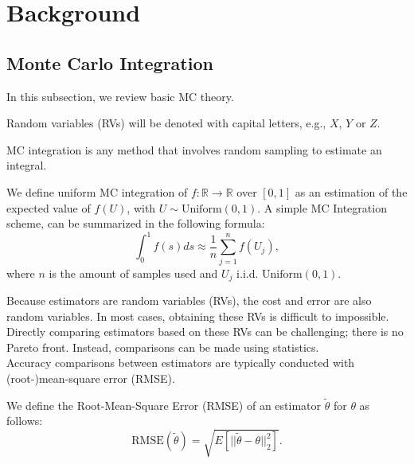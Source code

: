\documentclass[a4paper,12pt]{article}
\begin{document}
\section{Background}

\subsection{Monte Carlo Integration}

In this subsection, we review basic MC theory. \\

\begin{notation}
  Random variables (RVs) will be denoted with capital letters, e.g., $X$, $Y$ or $Z$.
\end{notation}


MC integration is any method that involves random sampling to
estimate an integral.
\begin{definition}
  We define uniform MC integration of
  $f:\mathbb{R} \rightarrow \mathbb{R}$
  over $[0,1]$ as
  an estimation of the expected value of $f(U)$, with
  $U \sim \text{Uniform}(0,1)$. A simple MC Integration
  scheme, can be summarized in the following formula:
  \begin{equation}\label{eq:BLUE}
    \int_{0}^1 f(s)ds \approx \frac{1}{n} \sum_{j=1}^{n}f(U_{j}),
  \end{equation}
  where $n$ is the amount of samples used and $U_{j}$ i.i.d. $\text{Uniform}(0,1)$.
\end{definition}

Because estimators are random variables (RVs), the cost and error are also random
variables. In most cases, obtaining these RVs is difficult to impossible.
Directly comparing estimators based on these RVs can be challenging;
there is no Pareto front. Instead, comparisons can be made
using statistics. \\

Accuracy comparisons between estimators
are typically conducted with (root-)mean-square error (RMSE).
\begin{definition}
  We define the Root-Mean-Square Error (RMSE) of an estimator $\tilde{\theta}$ for $\theta$  as follows:
  \begin{equation}
    \text{RMSE}(\tilde{\theta}) = \sqrt{E[||\tilde{\theta}-\theta||^{2}_{2}]}.
  \end{equation}
\end{definition}
\end{document}
